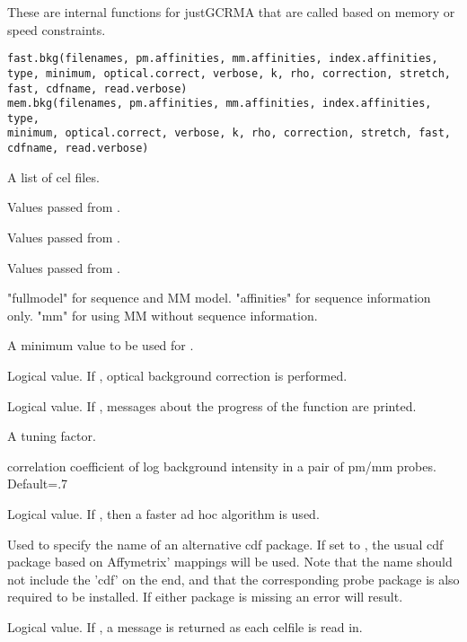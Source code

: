 \begin{Description}\relax
These are internal functions for justGCRMA that are called based on
memory or speed constraints.
\end{Description}
\begin{Usage}
\begin{verbatim}
fast.bkg(filenames, pm.affinities, mm.affinities, index.affinities,
type, minimum, optical.correct, verbose, k, rho, correction, stretch,
fast, cdfname, read.verbose)
mem.bkg(filenames, pm.affinities, mm.affinities, index.affinities, type,
minimum, optical.correct, verbose, k, rho, correction, stretch, fast,
cdfname, read.verbose)
\end{verbatim}
\end{Usage}
\begin{Arguments}
\begin{ldescription}
\item[\code{filenames}] A list of cel files.
\item[\code{pm.affinities}] Values passed from .
\item[\code{mm.affinities}] Values passed from .
\item[\code{index.affinities}] Values passed from .
\item[\code{type}] "fullmodel" for sequence and MM model. "affinities" for
sequence information only. "mm" for using MM without sequence
information.
\item[\code{minimum}] A minimum value to be used for .
\item[\code{optical.correct}] Logical value. If , optical
background correction is performed.
\item[\code{verbose}] Logical value. If , messages about the
progress of the function are printed.
\item[\code{k}] A tuning factor.
\item[\code{rho}] correlation coefficient of log background intensity in a pair
of pm/mm probes. Default=.7
\item[\code{correction}] 
\item[\code{stretch}] 
\item[\code{fast}] Logical value. If , then a faster ad hoc
algorithm is used.
\item[\code{cdfname}] Used to specify the name of an alternative cdf package. If set to
, the usual cdf package based on Affymetrix' mappings
will be used. Note that the name should not include the 'cdf' on
the end, and that the corresponding probe package is also required
to be installed. If either package is missing an error will result.
\item[\code{read.verbose}] Logical value. If , a message is
returned as each celfile is read in.
\end{ldescription}
\end{Arguments}
